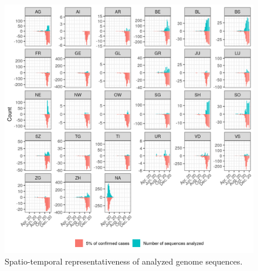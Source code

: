 \documentclass[9pt,twoside,lineno]{pnas-new}
\begin{document}
\begin{figure}
\centering
\includegraphics[width = 11.4cm]{figures/swiss_downsampling.png}
\caption{Spatio-temporal representativeness of analyzed genome sequences.}  
\label{fig:downsampling_representativeness}
\end{figure}
\end{document}
